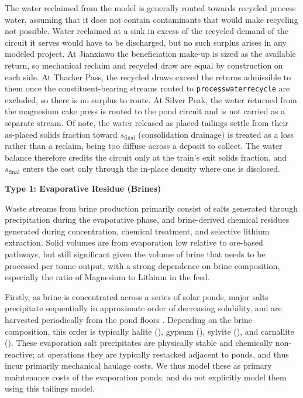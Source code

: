 \documentclass{article}
\renewcommand\_{\textunderscore\allowbreak}
\begin{document}
The water reclaimed from the model is generally routed towards recycled process water, assuming that it does not contain contaminants that would make recycling not possible. Water reclaimed at a sink in excess of the recycled demand of the circuit it serves would have to be discharged, but no such surplus arises in any modeled project. At Jianxiawo the beneficiation make-up is sized as the available return, so mechanical reclaim and recycled draw are equal by construction on each side. At Thacker Pass, the recycled draws exceed the returns admissible to them once the constituent-bearing streams routed to \texttt{process\_water\_recycle} are excluded, so there is no surplus to route. At Silver Peak, the water returned from the magnesium cake press is routed to the pond circuit and is not carried as a separate stream. Of note, the water released as placed tailings settle from their as-placed solids fraction toward $s_{\text{final}}$ (consolidation drainage) is treated as a loss rather than a reclaim, being too diffuse across a deposit to collect. The water balance therefore credits the circuit only at the train's exit solids fraction, and $s_{\text{final}}$ enters the cost only through the in-place density where one is disclosed.


\medskip
\noindent\textbf{Type 1: Evaporative Residue (Brines)}\quad

Waste streams from brine production primarily consist of salts generated through precipitation during the evaporative phase, and brine-derived chemical residues generated during concentration, chemical treatment, and selective lithium extraction. Solid volumes are from evaporation low relative to ore-based pathways, but still significant given the volume of brine that needs to be processed per tonne output, with a strong dependence on brine composition, especially the ratio of Magnesium to Lithium in the feed. 

Firstly, as brine is concentrated across a series of solar ponds, major salts precipitate sequentially in approximate order of decreasing solubility, and are harvested periodically from the pond floors \citep{flexerLithiumRecoveryBrines2018, garrettHandbookLithiumNatural2004, becerraTechnicalReportSummary2024}. Depending on the brine composition, this order is typically halite (), gypsum (), sylvite (), and carnallite (). These evaporation salt precipitates are physically stable and chemically non-reactive; at operations they are typically restacked adjacent to ponds, and thus incur primarily mechanical haulage costs. We thus model these as primary maintenance costs of the evaporation ponds, and do not explicitly model them using this tailings model.
\end{document}
